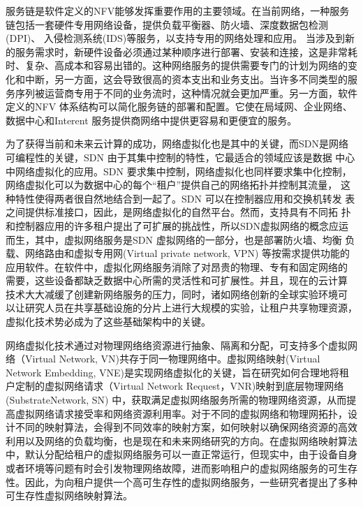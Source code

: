 服务链是软件定义的NFV能够发挥重要作用的主要领域\cite{friis2009service,lemmens2007enhancing}。在当前网络，一种服务链包括一套硬件专用网络设备，提供负载平衡器、防火墙、深度数据包检测(DPI)、 入侵检测系统(IDS)等服务，以支持专用的网络处理和应用\cite{greenberg2005clean,tschudin2001selnet,joseph2008policy,santos2008bridging}。 当涉及到新的服务需求时，新硬件设备必须通过某种顺序进行部署、安装和连接，这是非常耗时、复杂、高成本和容易出错的。这种网络服务的提供需要专门的计划为网络的变化和中断，另一方面，这会导致很高的资本支出和业务支出。当许多不同类型的服务序列被运营商专用于不同的业务流时，这种情况就会更加严重。另一方面，软件定义的NFV 体系结构可以简化服务链的部署和配置。它使在局域网、企业网络、数据中心和Interent 服务提供商网络中提供更容易和更便宜的服务。




为了获得当前和未来云计算的成功，网络虚拟化也是其中的关键，而SDN是网络可编程性的关键，SDN 由于其集中控制的特性，它最适合的领域应该是数据 中心中网络虚拟化的应用。SDN 要求集中控制，网络虚拟化也同样要求集中化控制，网络虚拟化可以为数据中心的每个“租户”提供自己的网络拓扑并控制其流量， 这种特性使得两者很自然地结合到一起了。SDN 可以在控制器应用和交换机转发 表之间提供标准接口，因此，是网络虚拟化的自然平台。然而，支持具有不同拓 扑和控制器应用的许多租户提出了可扩展的挑战性，所以SDN虚拟网络的概念应运而生，其中，虚拟网络服务是SDN 虚拟网络的一部分，也是部署防火墙、均衡 负载、网络路由和虚拟专用网(Virtual private network, VPN) 等按需求提供功能的 应用软件。在软件中，虚拟化网络服务消除了对昂贵的物理、专有和固定网络的 需要，这些设备都缺乏数据中心所需的灵活性和可扩展性。并且，现在的云计算 技术大大减缓了创建新网络服务的压力，同时，诸如网络创新的全球实验环境可 以让研究人员在共享基础设施的分片上进行大规模的实验，让租户共享物理资源， 虚拟化技术势必成为了这些基础架构中的关键。



网络虚拟化\cite{chowdhury2009network}技术通过对物理网络络资源进行抽象、隔离和分配，可支持多个虚拟网络（Virtual Network, VN)共存于同一物理网络中。虚拟网络映射\cite{fischer2013virtual}(Virtual Network Embedding, VNE)是实现网络虚拟化的关键，旨在研究如何合理地将租户定制的虚拟网络请求（Virtual Network Request，VNR)映射到底层物理网络 (SubstrateNetwork, SN) 中，获取满足虚拟网络服务所需的物理网络资源，从而提高虚拟网络请求接受率和网络资源利用率。对于不同的虚拟网络和物理网拓扑，设计不同的映射算法，会得到不同效率的映射方案，如何映射以确保网络资源的高效利用以及网络的负载均衡，也是现在和未来网络研究的方向。在虚拟网络映射算法中，默认分配给租户的虚拟网络服务可以一直正常运行，但现实中，由于设备自身或者环境等问题有时会引发物理网络故障，进而影响租户的虚拟网络服务的可生存性。因此，为向租户提供一个高可生存性的虚拟网络服务，一些研究者提出了多种可生存性虚拟网络映射算法\cite{herker2013survey}。

